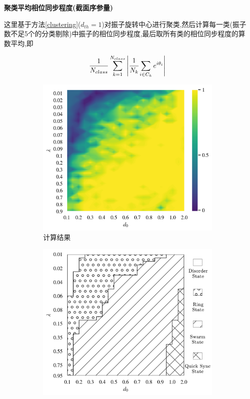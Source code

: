 \documentclass{article}
\begin{document}
\newpage
\noindent\textbf{聚类平均相位同步程度(截面序参量)}

这里基于方法\ref{clustering}($d_{th}=1$)对振子旋转中心进行聚类,然后计算每一类(振子数不足5个的分类剔除)中振子的相位同步程度,最后取所有类的相位同步程度的算数平均,即

$$\frac{1}{N_{class}}\sum_{k=1}^{N_{class}}\left|\cfrac{1}{N_{k}}\sum_{i\in C_{k}}e^{i\theta_i}\right|$$

\vspace{-0.5cm}
\begin{figure}[H]
	\centering
	\begin{subfigure}[b]{0.49\textwidth}
		\includegraphics[width=\textwidth]{./figs/clusteringPhaseSync.png}
		\vspace{-1cm}
		\caption{计算结果}
	\end{subfigure}
	\begin{subfigure}[b]{0.49\textwidth}
		\includegraphics[width=\textwidth]{./figs/subjectiveOp3.png}

\end{subfigure}
\end{figure}
\end{document}
